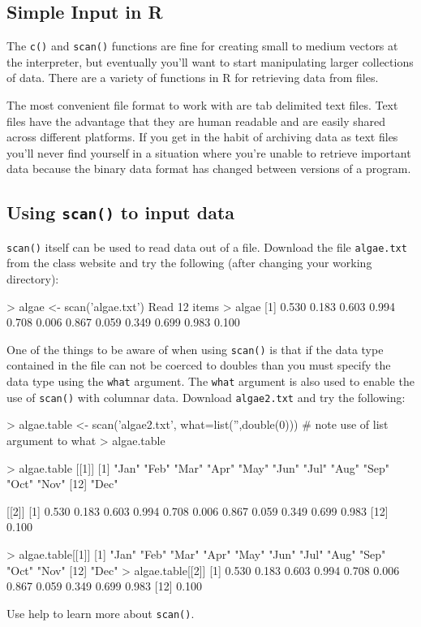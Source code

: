 \subsection{Simple Input in R}

The \lstinline!c()! and \lstinline!scan()! functions are fine for
creating small to medium vectors at the interpreter, but eventually
you'll want to start manipulating larger collections of data. There are
a variety of functions in R for retrieving data from files.

The most convenient file format to work with are tab delimited text
files. Text files have the advantage that they are human readable and
are easily shared across different platforms. If you get in the habit of
archiving data as text files you'll never find yourself in a situation
where you're unable to retrieve important data because the binary data
format has changed between versions of a program.

\subsection{Using \lstinline!scan()! to input data}

\lstinline!scan()! itself can be used to read data out of a file.
Download the file \lstinline!algae.txt! from the class website and try
the following (after changing your working directory):

\begin{R}
> algae <- scan('algae.txt')
Read 12 items
> algae
 [1] 0.530 0.183 0.603 0.994 0.708 0.006 0.867 0.059 0.349 0.699 0.983 0.100
\end{R}
One of the things to be aware of when using \lstinline!scan()! is that
if the data type contained in the file can not be coerced to doubles
than you must specify the data type using the \lstinline!what! argument.
The \lstinline!what! argument is also used to enable the use of
\lstinline!scan()! with columnar data. Download \lstinline!algae2.txt!
and try the following:

\begin{R}
> algae.table <- scan('algae2.txt', what=list('',double(0)))
                        # note use of list argument to what
> algae.table

> algae.table
[[1]]
 [1] "Jan" "Feb" "Mar" "Apr" "May" "Jun" "Jul" "Aug" "Sep" "Oct" "Nov"
[12] "Dec"

[[2]]
 [1] 0.530 0.183 0.603 0.994 0.708 0.006 0.867 0.059 0.349 0.699 0.983
[12] 0.100

> algae.table[[1]]
 [1] "Jan" "Feb" "Mar" "Apr" "May" "Jun" "Jul" "Aug" "Sep" "Oct" "Nov"
[12] "Dec"
> algae.table[[2]]
 [1] 0.530 0.183 0.603 0.994 0.708 0.006 0.867 0.059 0.349 0.699 0.983
[12] 0.100
\end{R}
Use help to learn more about \lstinline!scan()!.

